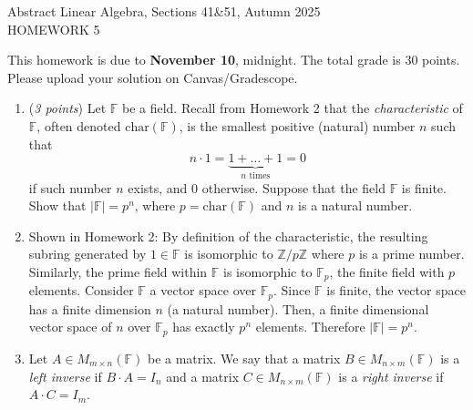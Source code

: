 \documentclass[11pt]{article}
\newcommand{\bbF}{\mathbb{F}}
\newcommand{\bbZ}{\mathbb{Z}}
\newcommand{\Char}{\mathrm{char}}
\newcommand{\head}[1]{
	\begin{center}
		{\large #1}
		\vspace{.2 in}
	\end{center}
	
	\bigskip 
}
\theoremstyle{definition}
\numberwithin{equation}{subsection}
\begin{document}
\pagestyle{plain}


\setcounter{section}{1}   

\head{Abstract Linear Algebra, Sections 41\&51, Autumn 2025\\ HOMEWORK 5} 

This homework is due to {\bf November 10}, midnight. The total grade is 30 points. Please upload your solution on Canvas/Gradescope.

\begin{enumerate}

\item (\emph {3 points}) Let $\bbF$ be a field. Recall from Homework 2 that the \emph{characteristic} of $\bbF$, often denoted $\Char(\bbF)$, is the smallest positive (natural) number $n$ such that
$$n\cdot 1 = \underbrace{1+\ldots +1}_{\text{$n$ times}} =0 $$
if such number $n$ exists, and $0$ otherwise. Suppose that the field $\bbF$ is finite. Show that $|\bbF|=p^n$, where $p=\Char(\bbF)$ and $n$ is a natural number.
\item[] Shown in Homework 2: By definition of the characteristic, the resulting subring generated by $1\in \bbF$ is isomorphic to $\bbZ/p\bbZ$ where $p$ is a prime number. Similarly, the prime field within $\bbF$ is isomorphic to $\bbF_p$, the finite field with $p$ elements. Consider $\bbF$ a vector space over $\bbF_p$. Since $\bbF$ is finite, the vector space has a finite dimension $n$ (a natural number). Then, a finite dimensional vector space of $n$ over $\bbF_p$ has exactly $p^n$ elements. Therefore $|\bbF|=p^n$.

\item Let $A \in M_{m\times n}(\bbF)$ be a matrix. We say that a matrix $B\in M_{n\times m}(\bbF)$ is a \emph{left inverse} if $B\cdot A= I_{n}$ and a matrix $C \in M_{n\times m}(\bbF)$ is a \emph{right inverse} if $A\cdot C = I_m$.


\end{enumerate}
\end{document}
